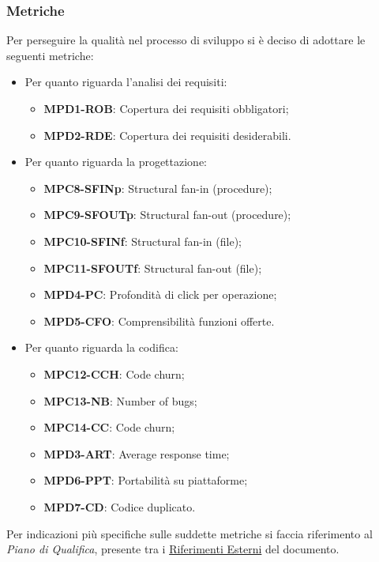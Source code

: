 \subsubsection{Metriche}\label{sec:processi_primari:sviluppo:metriche}
Per perseguire la qualità nel processo di sviluppo si è deciso di adottare le seguenti metriche:
\begin{itemize}
    \item Per quanto riguarda l'analisi dei requisiti:
    \begin{itemize}
        \item \textbf{MPD1-ROB}: Copertura dei requisiti obbligatori;
        \item \textbf{MPD2-RDE}: Copertura dei requisiti desiderabili.
    \end{itemize}
    \item Per quanto riguarda la progettazione:
    \begin{itemize}
        \item \textbf{MPC8-SFINp}: Structural fan-in (procedure);
        \item \textbf{MPC9-SFOUTp}: Structural fan-out (procedure);
        \item \textbf{MPC10-SFINf}: Structural fan-in (file);
        \item \textbf{MPC11-SFOUTf}: Structural fan-out (file);
        \item \textbf{MPD4-PC}: Profondità di click per operazione;
        \item \textbf{MPD5-CFO}: Comprensibilità funzioni offerte.
    \end{itemize}
    \item Per quanto riguarda la codifica:
    \begin{itemize}
        \item \textbf{MPC12-CCH}: Code churn;
        \item \textbf{MPC13-NB}: Number of bugs;
        \item \textbf{MPC14-CC}: Code churn;
        \item \textbf{MPD3-ART}: Average response time;
        \item \textbf{MPD6-PPT}: Portabilità su piattaforme;
        \item \textbf{MPD7-CD}: Codice duplicato.
    \end{itemize}
\end{itemize}
Per indicazioni più specifiche sulle suddette metriche si faccia riferimento al \textit{Piano di Qualifica}, presente tra i \hyperref[sec:riferimenti_esterni]{Riferimenti Esterni} del documento.

